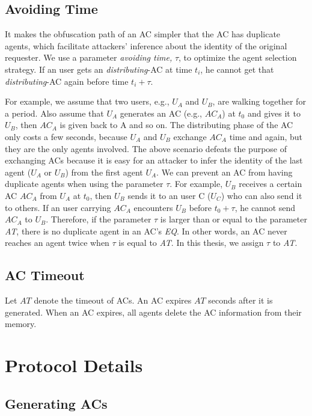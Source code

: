 \subsection{Avoiding Time} \label{subsubsecAvdTime}

It makes the obfuscation path of an AC simpler that the AC has duplicate agents, which facilitate attackers' inference about the identity of the original requester. We use a parameter \textit{avoiding time,} $\tau$, to optimize the agent selection strategy. If an user gets an \textit{distributing}-AC at time $t_i$, he cannot get that \textit{distributing}-AC again before time $t_i+\tau $.

For example, we assume that two users, e.g., $U_A$ and $U_B$, are walking together for a period. Also assume that $U_A$ generates an AC (e.g., ${AC}_A$) at $t_0$ and gives it to $U_B$, then ${AC}_A$ is given back to A and so on. The distributing phase of the AC only costs a few seconds, because $U_A$ and $U_B$ exchange ${AC}_A$ time and again, but they are the only agents involved. The above scenario defeats the purpose of exchanging ACs because it is easy for an attacker to infer the identity of the last agent ($U_A$ or $U_B$) from the first agent $U_A$. We can prevent an AC from having duplicate agents when using the parameter $\tau$. For example, $U_B$ receives a certain AC ${AC}_A$ from $U_A$ at $t_0$, then $U_B$ sends it to an user C ($U_C$) who can also send it to others. If an user carrying ${AC}_A$ encounters $U_B$ before $t_0+\tau $, he cannot send ${AC}_A$ to $U_B$. Therefore, if the parameter $\tau $ is larger than or equal to the parameter \textit{AT}, there is no duplicate agent in an AC's \textit{EQ}. In other words, an AC never reaches an agent twice when $\tau $ is equal to \textit{AT}. In this thesis, we assign $\tau $ to \textit{AT}. 

\subsection{AC Timeout}

\noindent Let $AT$ denote the timeout of ACs. An AC expires $AT$ seconds after it is generated. When an AC expires, all agents delete the AC information from their memory.

\section{Protocol Details}


\subsection{Generating ACs}

